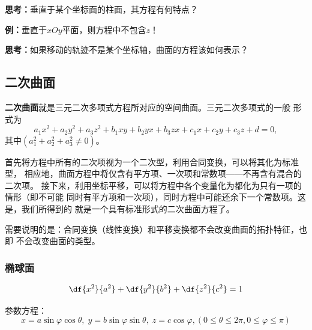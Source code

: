 \begin{center}
\end{center}

{\bf 思考：}垂直于某个坐标面的柱面，其方程有何特点？

{\bf 例：}垂直于$xOy$平面，则方程中不包含$z$！

{\bf 思考：}如果移动的轨迹不是某个坐标轴，曲面的方程该如何表示？

\subsection{二次曲面}

{\bf 二次曲面}就是{\kaishu 三元二次多项式方程}所对应的空间曲面。三元二次多项式的一般
形式为
$$a_1x^2+a_2y^2+a_3z^2+b_1xy+b_2yx+b_3zx +c_1x+c_2y+c_3z+d =  0,
$$
其中$(a_1^2+a_2^2+a_3^2\ne 0)$。

首先将方程中所有的二次项视为一个二次型，利用合同变换，可以将其化为标准型，
相应地，曲面方程中将仅含有平方项、一次项和常数项——不再含有混合的二次项。
接下来，利用坐标平移，可以将方程中各个变量化为都化为只有一项的情形（即不可能
同时有平方项和一次项），同时方程中可能还余下一个常数项。这是，我们所得到的
就是一个具有标准形式的二次曲面方程了。

需要说明的是：合同变换（线性变换）和平移变换都不会改变曲面的拓扑特征，也即
不会改变曲面的类型。

\subsubsection{椭球面}
$${\df{x^2}{a^2}+\df{y^2}{b^2}+\df{z^2}{c^2}=1}$$
\begin{center}
\end{center}
参数方程：
$${x=a\sin\varphi\cos\theta,\;y=b\sin\varphi\sin\theta,\;z=c\cos\varphi},
{(0\leq\theta\leq
2\pi,0\leq\varphi\leq\pi)}$$

